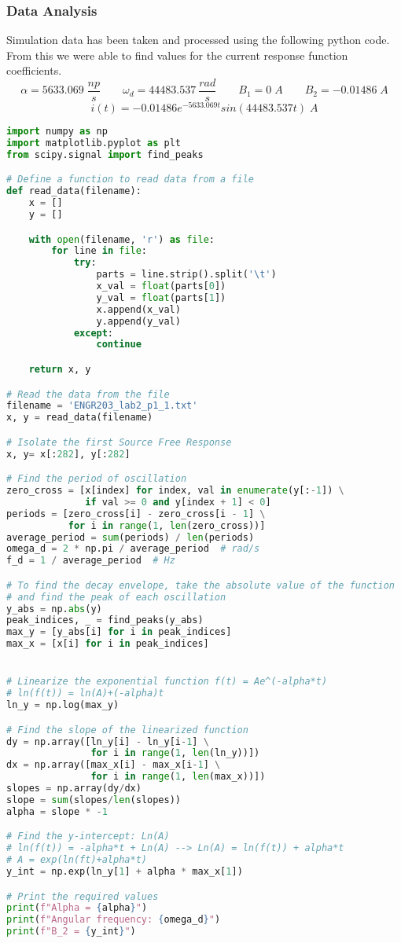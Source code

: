 \documentclass[11pt]{article}
\begin{document}
\subsubsection*{\textcolor{mycolor}{Data Analysis}}
Simulation data has been taken and processed using the following python code. From this we were able to find values for the current response function coefficients.
$$\alpha = 5633.069 \;\frac{np}{s} \qquad \omega_d = 44483.537\ \frac{rad}{s} \qquad B_1 = 0 \;A \qquad B_2 = -0.01486 \;A$$
$$i(t) = -0.01486e^{-5633.069t}sin(44483.537t) \;A$$
\begin{lstlisting}[language=Python]
import numpy as np
import matplotlib.pyplot as plt
from scipy.signal import find_peaks

# Define a function to read data from a file
def read_data(filename):
    x = []
    y = []

    with open(filename, 'r') as file:
        for line in file:
            try:
                parts = line.strip().split('\t')
                x_val = float(parts[0])
                y_val = float(parts[1])
                x.append(x_val)
                y.append(y_val)
            except:
                continue

    return x, y

# Read the data from the file
filename = 'ENGR203_lab2_p1_1.txt'
x, y = read_data(filename)

# Isolate the first Source Free Response
x, y= x[:282], y[:282]

# Find the period of oscillation
zero_cross = [x[index] for index, val in enumerate(y[:-1]) \
              if val >= 0 and y[index + 1] < 0]
periods = [zero_cross[i] - zero_cross[i - 1] \
           for i in range(1, len(zero_cross))]
average_period = sum(periods) / len(periods)
omega_d = 2 * np.pi / average_period  # rad/s
f_d = 1 / average_period  # Hz

# To find the decay envelope, take the absolute value of the function
# and find the peak of each oscillation
y_abs = np.abs(y)
peak_indices, _ = find_peaks(y_abs)
max_y = [y_abs[i] for i in peak_indices]
max_x = [x[i] for i in peak_indices]


# Linearize the exponential function f(t) = Ae^(-alpha*t)
# ln(f(t)) = ln(A)+(-alpha)t
ln_y = np.log(max_y)

# Find the slope of the linearized function
dy = np.array([ln_y[i] - ln_y[i-1] \
               for i in range(1, len(ln_y))])
dx = np.array([max_x[i] - max_x[i-1] \
               for i in range(1, len(max_x))])
slopes = np.array(dy/dx)
slope = sum(slopes/len(slopes))
alpha = slope * -1

# Find the y-intercept: Ln(A)
# ln(f(t)) = -alpha*t + Ln(A) --> Ln(A) = ln(f(t)) + alpha*t
# A = exp(ln(ft)+alpha*t)
y_int = np.exp(ln_y[1] + alpha * max_x[1])

# Print the required values
print(f"Alpha = {alpha}")
print(f"Angular frequency: {omega_d}")
print(f"B_2 = {y_int}")
\end{lstlisting}
\end{document}
